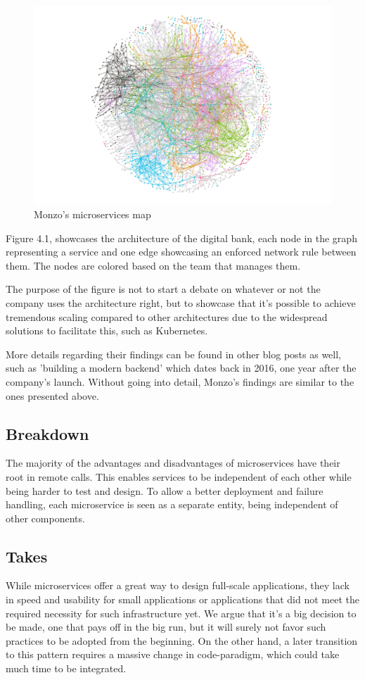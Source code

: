 \begin{figure}[H]
\centering
\includegraphics[width=1\linewidth]{content/fig/monzo-microservices-team-colored.png}
\caption{Monzo's microservices map}
\end{figure}

Figure 4.1\cite{monzo}, showcases the architecture of the digital bank, each node in the graph representing a service and one edge showcasing an enforced network rule between them. The nodes are colored based on the team that manages them. 

The purpose of the figure is not to start a debate on whatever or not the company uses the architecture right, but to showcase that it's possible to achieve tremendous scaling compared to other architectures due to the widespread solutions to facilitate this, such as Kubernetes.

More details regarding their findings can be found in other blog posts as well, such as 'building a modern backend' which dates back in 2016, one year after the company's launch.
Without going into detail, Monzo's findings are similar to the ones presented above\cite{viggiato}.

\subsection*{Breakdown}
The majority of the advantages and disadvantages of microservices have their root in remote calls. This enables services to be independent of each other while being harder to test and design. To allow a better deployment and failure handling, each microservice is seen as a separate entity, being independent of other components.

\subsection*{Takes}
While microservices offer a great way to design full-scale applications, they lack in speed and usability for small applications or applications that did not meet the required necessity for such infrastructure yet. We argue that it's a big decision to be made, one that pays off in the big run, but it will surely not favor such practices to be adopted from the beginning. On the other hand, a later transition to this pattern requires a massive change in code-paradigm, which could take much time to be integrated. 

